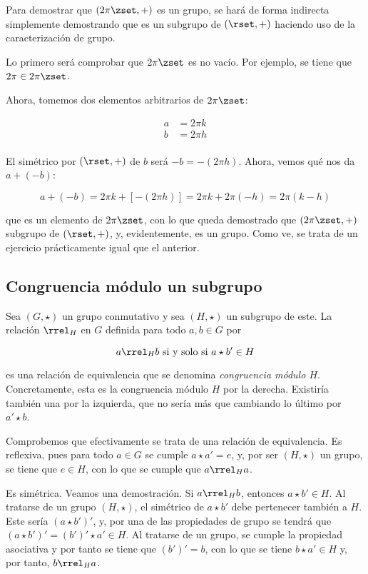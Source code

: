 Para demostrar que $(2\pi \zset, +)$ es un grupo, se hará de forma indirecta
simplemente demostrando que es un subgrupo de $(\rset, +)$ haciendo uso de
la caracterización de grupo.

Lo primero será comprobar que $2\pi \zset$ es no vacío. Por ejemplo, se
tiene que $2\pi \in 2\pi \zset$.

Ahora, tomemos dos elementos arbitrarios de $2\pi \zset$:

\begin{align*}
  a &= 2\pi k \\
  b &= 2\pi h \\
\end{align*}

\noindent El simétrico por $(\rset, +)$ de $b$ será ${-b} = {-(2\pi h)}$.
Ahora, vemos qué nos da $a + ({-b})$:

$$ a + ({-b}) = 2\pi k + [{-(2\pi h)}] = 2\pi k + 2\pi({-h}) = 2\pi(k - h)
$$

\noindent que es un elemento de $2\pi\zset$, con lo que queda demostrado que
$(2\pi \zset, +)$ subgrupo de $(\rset, +)$, y, evidentemente, es un grupo.
Como ve, se trata de un ejercicio prácticamente igual que el anterior.





\subsection{Congruencia módulo un subgrupo}

Sea $(G,\star)$ un grupo conmutativo y sea $(H, \star)$ un subgrupo de este.
La relación $\rrel_H$ en $G$ definida para todo $a, b \in G$ por

$$ a \rrel_H b \ \text{si y solo si} \ a \star b' \in H $$

\noindent es una relación de equivalencia que se denomina \emph{congruencia
módulo $H$}. Concretamente, esta es la congruencia módulo $H$ por la
derecha. Existiría también una por la izquierda, que no sería más que
cambiando lo último por $a' \star b$.

Comprobemos que efectivamente se trata de una relación de equivalencia. Es
reflexiva, pues para todo $a \in G$ se cumple $a \star a' = e$, y, por ser
$(H, \star)$ un grupo, se tiene que $e \in H$, con lo que se cumple que $a
\rrel_H a$.

Es simétrica. Veamos una demostración. Si $a \rrel_H b$, entonces $a \star
b' \in H$. Al tratarse de un grupo $(H, \star)$, el simétrico de $a \star
b'$ debe pertenecer también a $H$. Este sería $(a \star b')'$, y, por una de
las propiedades de grupo se tendrá que $(a \star b')' = (b')' \star a' \in
H$. Al tratarse de un grupo, se cumple la propiedad asociativa y por tanto
se tiene que $(b')' = b$, con lo que se tiene $b \star a' \in H$ y, por
tanto, $b \rrel_H a$.

